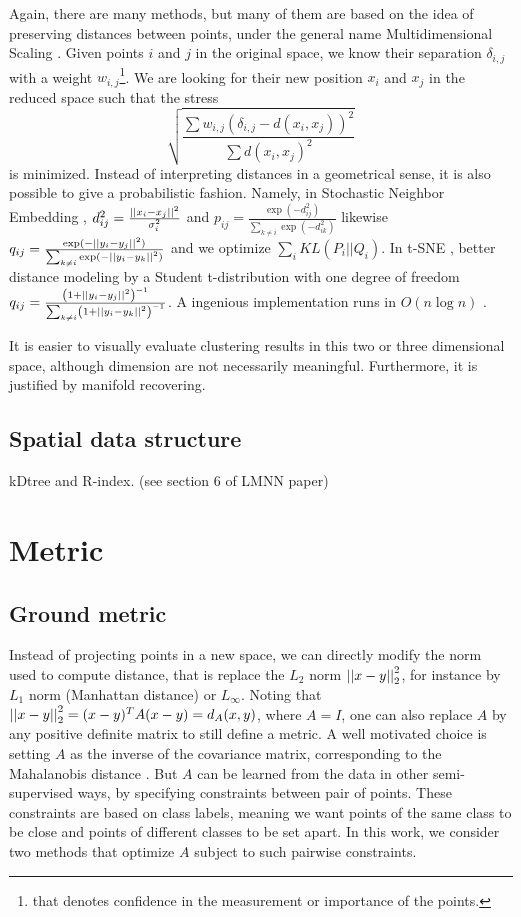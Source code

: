 Again, there are many methods, but many of them are based on the idea of
preserving distances between points, under the general name Multidimensional
Scaling \autocite{MDS77}. Given points $i$ and $j$ in the original space, we
know their separation $\delta_{i,j}$ with a weight $w_{i,j}$\footnote{that
denotes confidence in the measurement or importance of the points.}. We are
looking for their new position $x_i$ and $x_j$ in the reduced space such that
the stress \[ \sqrt{\frac{\sum w_{i,j}(\delta_{i,j} - d(x_i, x_j))^2}{\sum
d(x_i, x_j)^2}} \] is minimized. Instead of interpreting distances in a
geometrical sense, it is also possible to give a probabilistic fashion.
Namely, in Stochastic Neighbor Embedding \autocite{SNE02}, $d^2_{ij} =
\frac{\left|\left|x_i - x_j\right|\right|^2}{\sigma^2_i}$  and $p_{ij} =
\frac{\exp(-d_{ij}^2)}{\sum_{k \neq i}\exp(-d_{ik}^2)}$ likewise $q_{ij} =
\frac{\exp(-\left|\left|y_i - y_j\right|\right|^2)}{\sum_{k \neq i}\exp(-\left|\left|y_i - y_k\right|\right|^2)}$
and we optimize $\sum_i KL(P_i || Q_i)$. In t-SNE \autocite{tSNE08}, better
distance modeling by a Student t-distribution with one degree of freedom
$q_{ij} = \frac{\left(1+\left|\left|y_i - y_j\right|\right|^2\right)^{-1}}{\sum_{k \neq
i}\left(1+\left|\left|y_i - y_k\right|\right|^2\right)^{-1}}$. A ingenious implementation runs
in $O(n\log n)$ \autocite{BarnesHut13}.

It is easier to visually evaluate clustering results in this two or three
dimensional space, although dimension are not necessarily meaningful.
Furthermore, it is justified by manifold recovering.

\subsection{Spatial data structure} kDtree and R-index. (see section 6 of LMNN
paper)

\section{Metric} \label{sec:metric}

\subsection{Ground metric}

Instead of projecting points in a new space, we can directly modify the norm
used to compute distance, that is replace the $L_2$ norm $\left|\left|x-y\right|\right|_2^2$,
for instance by $L_1$ norm (Manhattan distance) or $L_\infty$. Noting that
$\left|\left|x-y\right|\right|_2^2 = (x-y)^T A (x-y) = d_A(x,y)$, where $A=I$, one can also
replace $A$ by any positive definite matrix to still define a metric. A well
motivated choice is setting $A$ as the inverse of the covariance matrix,
corresponding to the Mahalanobis distance \autocite{Mahalanobis36}. But $A$
can be learned from the data in other semi-supervised ways, by specifying
constraints between pair of points. These constraints are based on class
labels, meaning we want points of the same class to be close and points of
different classes to be set apart. In this work, we consider two methods that
optimize $A$ subject to such pairwise constraints.

